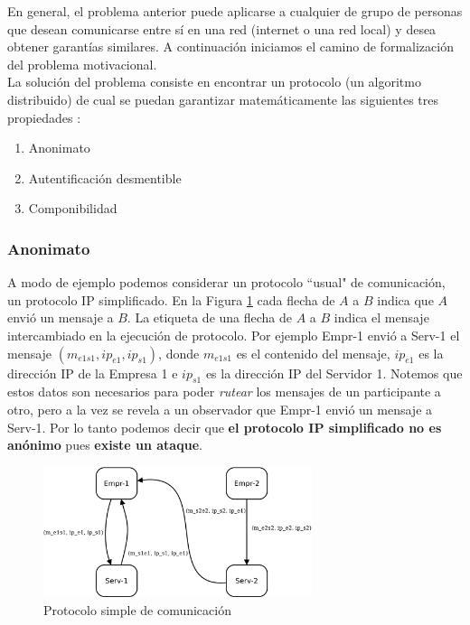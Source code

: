 En general, el problema anterior puede aplicarse a cualquier de grupo de personas que
desean comunicarse entre sí en una red (internet o una red local) y desea obtener garantías
similares. A continuación iniciamos el camino de formalización del problema motivacional.\\
La solución del problema consiste en encontrar un protocolo (un algoritmo distribuido) de cual
se puedan garantizar matemáticamente las siguientes tres propiedades :
\begin{enumerate}
    \item Anonimato
    \item Autentificación desmentible
    \item Componibilidad
\end{enumerate}

\subsubsection{Anonimato}
A modo de ejemplo podemos considerar un protocolo ``usual" de comunicación, un protocolo IP simplificado.
En la Figura \ref{tcpip_simple} cada flecha de $A$ a $B$ indica que $A$ envió un mensaje a
$B$. La etiqueta de una flecha de $A$ a $B$ indica el mensaje intercambiado en la ejecución de protocolo.
Por ejemplo Empr-1 envió a Serv-1 el mensaje $(m_{e1s1}, ip_{e1}, ip_{s1})$, donde $m_{e1s1}$ es el contenido
del mensaje, $ip_{e1}$ es la dirección IP de la Empresa 1 e $ip_{s1}$ es la dirección IP del Servidor 1.
Notemos que estos
datos son necesarios para poder \textit{rutear} los mensajes de un participante a otro, pero a la vez 
se revela a un observador que Empr-1 envió un mensaje a Serv-1. Por lo tanto podemos decir que
\textbf{el protocolo IP simplificado no es anónimo} pues \textbf{existe un ataque}.\\

\begin{figure}[hp]
    \centering
    \includegraphics[width=0.7\textwidth]{figs/tcpip_simple}
    \caption{Protocolo simple de comunicación}
    \label{tcpip_simple}
\end{figure}


